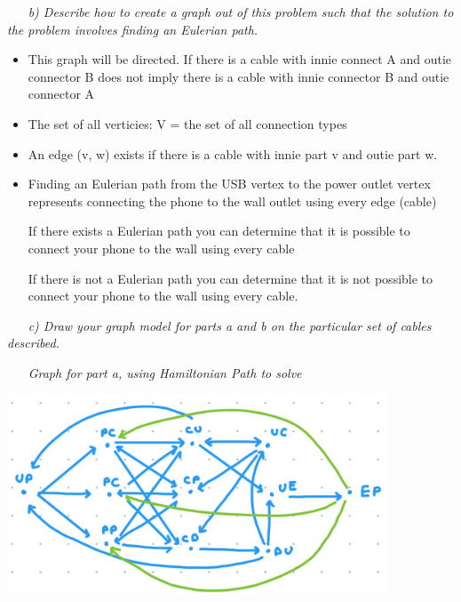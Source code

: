 \documentclass[12pt, letterpaper]{article}
\begin{document}
\-\ \newline \newline 
\-\ \it{ b) Describe how to create a graph out of this problem such that the solution to the problem involves finding an Eulerian path. }
\begin{itemize}
\item \textnormal{ This graph will be directed. If there is a cable with innie connect A and outie connector B does not imply there is a cable with innie connector B and outie connector A  }
\item \textnormal{ The set of all verticies: V = the set of all connection types  }
\item \textnormal{ An edge (v, w) exists if there is a cable with innie part v and outie part w. }
\item \textnormal{ Finding an Eulerian path from the USB vertex to the power outlet vertex represents connecting the phone to the wall outlet using every edge (cable) } \newline

\textnormal{ If there exists a Eulerian path you can determine that it is possible to connect your phone to the wall using every cable } \newline

\textnormal{ If there is not a Eulerian path you can determine that it is not possible to connect your phone to the wall using every cable. } \newline

\end{itemize}

\-\ \newline \newline 
\-\ \it{ c) Draw your graph model for parts a and b on the particular set of cables described. }

\-\ \newline
\-\ \it{ Graph for part a, using Hamiltonian Path to solve } \newline
\begin{center}
\includegraphics[width=0.85\textwidth]{graph1.jpeg}
\end{center}
\end{document}
